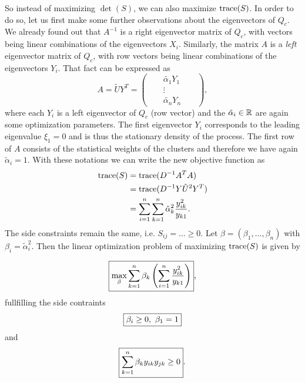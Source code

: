 So instead of maximizing $\det(S)$, we can also maximize $\mathrm{trace}(S)$. In order to do so, let us first make some further observations about the eigenvectors of $Q_c$.
We already found out that $A^{-1}$ is a right eigenvector matrix of $Q_c$, with vectors being linear combinations of the eigenvectors $X_i$.
Similarly, the matrix $A$ is a \textit{left} eigenvector matrix of $Q_c$, with row vectors being linear combinations of the eigenvectors $Y_i$. That fact can be expressed as
\begin{equation*}
A= \tilde{U}Y^T =
\begin{pmatrix}
 & & \tilde{\alpha_1}Y_1   & &  \\
 & & \vdots                       & &   \\
 & & \tilde{\alpha_n}Y_n   & &
\end{pmatrix},
\end{equation*}
where each $Y_i$ is a left eigenvector of $Q_c$ (row vector) and the $\tilde{\alpha}_i \in \mathbb{R}$ are again some optimization parameters.
The first eigenvector $Y_i$ corresponds to the leading eigenvalue $\xi_1 = 0$ and is thus the stationary density of the process. The first row of $A$ consists of the statistical weights of the clusters 
and therefore we have again $\tilde{\alpha}_i = 1$.
With these notations we can write the new objective function as
\begin{align*}
\mathrm{trace}(S) & = \mathrm{trace}(D^{-1} A^T A) \\
              & = \mathrm{trace}(D^{-1}Y \tilde{U}^2 Y^T) \\
              & = \sum_{i=1}^n \sum_{k=1}^n \tilde{\alpha}_k^2 \frac{y_{ik}^2}{y_{k1}}.
\end{align*}
The side constraints remain the same, i.e. $S_{ij} = \dots \geq 0$. 
Let $\beta = (\beta_1,\dots, \beta_n)$ with $\beta_i = \tilde{\alpha}_i^2$.
Then the linear optimization problem of maximizing $\mathrm{trace}(S)$ is given by

\begin{equation}
\label{eq:optimization_linear}
\mbox{
	\boxed{ \max_{\beta} \sum_{k=1}^n \beta_k \left( \sum_{i=1}^n 			\frac{y_{ik}^2}{y_{k1}} \right)},
}
\end{equation}
fullfilling the side contraints
\begin{equation*}
\mbox{
	\boxed{ \beta_i \geq 0, \ \beta_1 = 1}
}
\end{equation*}
and
\begin{equation*}
\mbox{
	\boxed{ \sum_{k=1}^n \beta_k y_{ik} y_{jk} \geq 0}.
}
\end{equation*}

